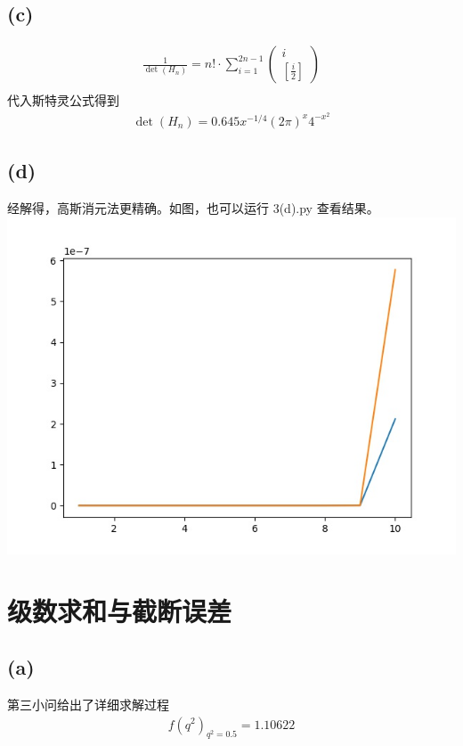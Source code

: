 \documentclass{article}
\numberwithin{equation}{section}
\begin{document}
\subsection*{(c)}
\begin{align}
    \frac{1}{\det\left(H_n\right)}=n!\cdot\sum_{i=1}^{2n-1}\begin{pmatrix}
        i \\
        \left[\frac{i}{2}\right]
    \end{pmatrix} \\
\end{align}
代入斯特灵公式得到
\begin{align}
    \det\left(H_n\right)=0.645x^{-1/4} (2\pi)^x 4^{-x^2}
\end{align}
\subsection*{(d)}
经解得，高斯消元法更精确。如图，也可以运行 3(d).py 查看结果。\\
\includegraphics[scale=0.4]{assets/3(d).jpg}
\section{级数求和与截断误差}
\subsection*{(a)}
第三小问给出了详细求解过程
\begin{align}
    f\left(q^2\right)_{q^2=0.5}=1.10622
\end{align}
\end{document}
